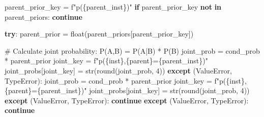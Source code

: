 \documentclass[
  11pt,
  letterpaper,
]{book}
\newenvironment{Shaded}{\begin{snugshade}}{\end{snugshade}}
\newcommand{\BuiltInTok}[1]{\textcolor[rgb]{0.00,0.23,0.31}{#1}}
\newcommand{\CommentTok}[1]{\textcolor[rgb]{0.37,0.37,0.37}{#1}}
\newcommand{\ControlFlowTok}[1]{\textcolor[rgb]{0.00,0.23,0.31}{\textbf{#1}}}
\newcommand{\DecValTok}[1]{\textcolor[rgb]{0.68,0.00,0.00}{#1}}
\newcommand{\KeywordTok}[1]{\textcolor[rgb]{0.00,0.23,0.31}{\textbf{#1}}}
\newcommand{\NormalTok}[1]{\textcolor[rgb]{0.00,0.23,0.31}{#1}}
\newcommand{\OperatorTok}[1]{\textcolor[rgb]{0.37,0.37,0.37}{#1}}
\newcommand{\PreprocessorTok}[1]{\textcolor[rgb]{0.68,0.00,0.00}{#1}}
\newcommand{\SpecialCharTok}[1]{\textcolor[rgb]{0.37,0.37,0.37}{#1}}
\newcommand{\SpecialStringTok}[1]{\textcolor[rgb]{0.13,0.47,0.30}{#1}}
\begin{document}
\begin{Shaded}
\begin{Highlighting}[]
\NormalTok{                            parent\_prior\_key }\OperatorTok{=} \SpecialStringTok{f"p(}\SpecialCharTok{\{}\NormalTok{parent\_inst}\SpecialCharTok{\}}\SpecialStringTok{)"}
                            \ControlFlowTok{if}\NormalTok{ parent\_prior\_key }\KeywordTok{not} \KeywordTok{in}\NormalTok{ parent\_priors:}
                                \ControlFlowTok{continue}

                            \ControlFlowTok{try}\NormalTok{:}
\NormalTok{                                parent\_prior }\OperatorTok{=} \BuiltInTok{float}\NormalTok{(parent\_priors[parent\_prior\_key])}

                                \CommentTok{\# Calculate joint probability: P(A,B) = P(A|B) * P(B)}
\NormalTok{                                joint\_prob }\OperatorTok{=}\NormalTok{ cond\_prob }\OperatorTok{*}\NormalTok{ parent\_prior}
\NormalTok{                                joint\_key }\OperatorTok{=} \SpecialStringTok{f"p(}\SpecialCharTok{\{}\NormalTok{inst}\SpecialCharTok{\}}\SpecialStringTok{,}\SpecialCharTok{\{}\NormalTok{parent}\SpecialCharTok{\}}\SpecialStringTok{=}\SpecialCharTok{\{}\NormalTok{parent\_inst}\SpecialCharTok{\}}\SpecialStringTok{)"}
\NormalTok{                                joint\_probs[joint\_key] }\OperatorTok{=} \BuiltInTok{str}\NormalTok{(}\BuiltInTok{round}\NormalTok{(joint\_prob, }\DecValTok{4}\NormalTok{))}
                            \ControlFlowTok{except}\NormalTok{ (}\PreprocessorTok{ValueError}\NormalTok{, }\PreprocessorTok{TypeError}\NormalTok{):}
\NormalTok{                                joint\_prob }\OperatorTok{=}\NormalTok{ cond\_prob }\OperatorTok{*}\NormalTok{ parent\_prior}
\NormalTok{                                joint\_key }\OperatorTok{=} \SpecialStringTok{f"p(}\SpecialCharTok{\{}\NormalTok{inst}\SpecialCharTok{\}}\SpecialStringTok{,}\SpecialCharTok{\{}\NormalTok{parent}\SpecialCharTok{\}}\SpecialStringTok{=}\SpecialCharTok{\{}\NormalTok{parent\_inst}\SpecialCharTok{\}}\SpecialStringTok{)"}
\NormalTok{                                joint\_probs[joint\_key] }\OperatorTok{=} \BuiltInTok{str}\NormalTok{(}\BuiltInTok{round}\NormalTok{(joint\_prob, }\DecValTok{4}\NormalTok{))}
                            \ControlFlowTok{except}\NormalTok{ (}\PreprocessorTok{ValueError}\NormalTok{, }\PreprocessorTok{TypeError}\NormalTok{):}
                                \ControlFlowTok{continue}
                        \ControlFlowTok{except}\NormalTok{ (}\PreprocessorTok{ValueError}\NormalTok{, }\PreprocessorTok{TypeError}\NormalTok{):}
                            \ControlFlowTok{continue}


\end{Highlighting}
\end{Shaded}
\end{document}

